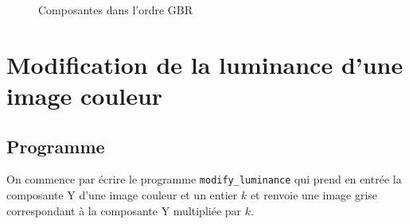 \documentclass[french,a4paper,10pt]{article}
\begin{document}
\begin{figure}[!htb]
\begin{minipage}{0.3\textwidth}
            \caption{Composantes dans l'ordre GBR}\label{Fig:peppers_mix-GBR}
        \end{minipage}
    \end{figure}

    \newpage

    \section{Modification de la luminance d'une image couleur}\label{sec:5}

    \subsection{Programme}\label{subsec:5.1}

    On commence par écrire le programme \texttt{modify\_luminance} qui prend en
    entrée la composante Y d'une image couleur et un entier $k$ et renvoie une
    image grise correspondant à la composante Y multipliée par $k$.
\end{document}
